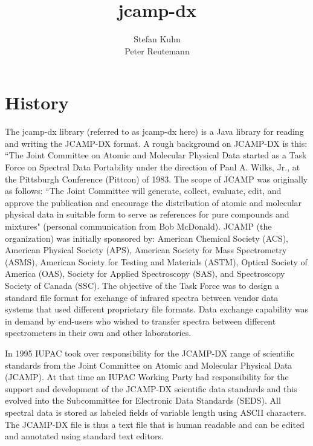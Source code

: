 \documentclass[a4paper]{book}
\title{
  {\Large \textbf{jcamp-dx}}
}
\author{
  Stefan Kuhn \\
  Peter Reutemann
}
\begin{document}
\begin{titlepage}
\maketitle

\end{titlepage}

\tableofcontents

\chapter{History}

The jcamp-dx library (referred to as jcamp-dx here) is a Java library for
reading and writing the JCAMP-DX format. A rough background on JCAMP-DX is this:
``The Joint Committee on Atomic and Molecular Physical Data started as a Task
Force on Spectral Data Portability under the direction of Paul A. Wilks, Jr., at
the Pittsburgh Conference (Pittcon) of 1983. The scope of JCAMP was originally
as follows: ``The Joint Committee will generate, collect, evaluate, edit, and
approve the publication and encourage the distribution of atomic and molecular
physical data in suitable form to serve as references for pure compounds and
mixtures" (personal communication from Bob McDonald). JCAMP (the organization)
was initially sponsored by: American Chemical Society (ACS), American Physical
Society (APS), American Society for Mass Spectrometry (ASMS), American Society
for Testing and Materials (ASTM), Optical Society of America (OAS), Society for
Applied Spectroscopy (SAS), and Spectroscopy Society of Canada (SSC). The
objective of the Task Force was to design a standard file format for exchange of
infrared spectra between vendor data systems that used different proprietary
file formats. Data exchange capability was in demand by end-users who wished to
transfer spectra between different spectrometers in their own and other
laboratories.

In 1995 IUPAC took over responsibility for the JCAMP-DX range of scientific
standards from the Joint Committee on Atomic and Molecular Physical Data
(JCAMP). At that time an IUPAC Working Party had responsibility for the support
and development of the JCAMP-DX scientific data standards and this evolved into
the Subcommittee for Electronic Data Standards (SEDS). All spectral data is
stored as labeled fields of variable length using ASCII characters. The JCAMP-DX
file is thus a text file that is human readable and can be edited and annotated
using standard text editors.
\end{document}

